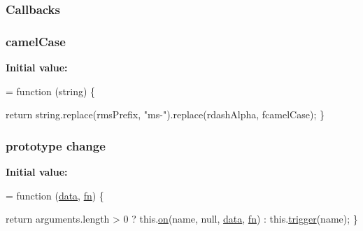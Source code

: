 \subsubsection[{\texorpdfstring{Callbacks}{Callbacks}}]{ Callbacks}\hypertarget{jquery-2_82_81-vsdoc_8js_add8d59d25831bb9b171fdbee8a18795b}{}\label{jquery-2_82_81-vsdoc_8js_add8d59d25831bb9b171fdbee8a18795b}
\subsubsection[{\texorpdfstring{camel\+Case}{camelCase}}]{ camel\+Case}\hypertarget{jquery-2_82_81-vsdoc_8js_a4925571918a5ff725c5e5fb8a6ab19a4}{}\label{jquery-2_82_81-vsdoc_8js_a4925571918a5ff725c5e5fb8a6ab19a4}
{\bfseries Initial value\+:}
\begin{DoxyCode}
= \textcolor{keyword}{function} (string) \{

        \textcolor{keywordflow}{return} \textcolor{keywordtype}{string}.replace(rmsPrefix, \textcolor{stringliteral}{"ms-"}).replace(rdashAlpha, fcamelCase);
    \}
\end{DoxyCode}
\subsubsection[{\texorpdfstring{change}{change}}]{ {\bf prototype} change}\hypertarget{jquery-2_82_81-vsdoc_8js_a457ba1597967ed9e42e50a10a750290b}{}\label{jquery-2_82_81-vsdoc_8js_a457ba1597967ed9e42e50a10a750290b}
{\bfseries Initial value\+:}
\begin{DoxyCode}
= \textcolor{keyword}{function} (\hyperlink{jquery-2_82_81-vsdoc_8js_a609407b3456fdc3c5671a9fc4a226ff7}{data}, \hyperlink{jquery-2_82_81-vsdoc_8js_acef6bdaf6b9b20fdcca1ea86f0902c3b}{fn}) \{
        

        \textcolor{keywordflow}{return} arguments.length > 0 ?
            this.\hyperlink{jquery-2_82_81-vsdoc_8js_ae453b412b883f60220d73468ef6c6dbc}{on}(name, null, \hyperlink{jquery-2_82_81-vsdoc_8js_a609407b3456fdc3c5671a9fc4a226ff7}{data}, \hyperlink{jquery-2_82_81-vsdoc_8js_acef6bdaf6b9b20fdcca1ea86f0902c3b}{fn}) :
            this.\hyperlink{jquery-2_82_81-vsdoc_8js_a2388c4114d5e3e4eab020f973641519c}{trigger}(name);
    \}
\end{DoxyCode}
